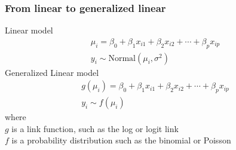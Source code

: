 \documentclass[color=usenames,dvipsnames]{beamer}\usepackage[]{graphicx}\usepackage[]{xcolor}
\begin{document}



\begin{frame}
  \frametitle{From linear to generalized linear}
  {Linear model}
  \begin{gather*}
    \mu_i = \beta_0 + \beta_1 x_{i1} + \beta_2 x_{i2} + \cdots + \beta_p x_{ip} \\
    y_i \sim \mathrm{Normal}(\mu_i, \sigma^2)
  \end{gather*}
  \pause
  \vfill
  {Generalized Linear model}
  \begin{gather*}
    g(\mu_i) = \beta_0 + \beta_1 x_{i1} + \beta_2 x_{i2} + \cdots + \beta_p x_{ip} \\
    y_i \sim f(\mu_i)
  \end{gather*}
  \pause
  {where} \\
  $g$ is a link function, such as the log or logit link \\
  \pause
  $f$ is a probability distribution such as the binomial or Poisson
\end{frame}


\end{document}
